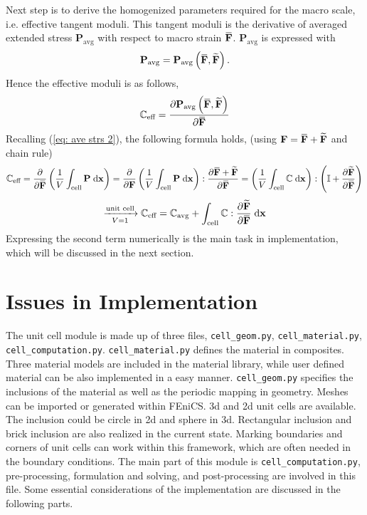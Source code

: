 \documentclass[10pt,a4paper]{scrreprt}
\newcommand{\myd}{\;\mathrm{d}}
\newcommand{\overbar}[1]{\mkern 1.5mu\overline{\mkern-1.5mu#1\mkern-1.5mu}\mkern 1.5mu}
\begin{document}
Next step is to derive the homogenized parameters required for the macro scale, i.e. effective tangent moduli. This tangent moduli is the derivative of averaged extended stress $\mathbf{P}_{\text{avg}}$ with respect to macro strain $\overbar{\mathbf{F}}$. $\mathbf{P}_{\text{avg}}$ is expressed with 
\begin{equation}
\mathbf{P}_{\text{avg}} = \mathbf{P}_{\text{avg}} \left( \overbar{\mathbf{F}}, \widetilde{\mathbf{F}} \right).
\end{equation}
Hence the effective moduli is as follows,
\begin{equation}
\mathbb{C}_{\text{eff}} = \dfrac{\partial \mathbf{P}_{\text{avg}} \left( \overbar{\mathbf{F}}, \widetilde{\mathbf{F}} \right)}{\partial \overbar{\mathbf{F}}}
\end{equation}
Recalling (\ref{eq: ave strs 2}), the following formula holds, (using $\mathbf{F} = \overbar{\mathbf{F}} + \widetilde{\mathbf{F}}$ and chain rule)
\[
\mathbb{C}_{\text{eff}} = \dfrac{\partial}{\partial \overbar{\mathbf{F}}} \left( \dfrac{1}{V} \int_{\text{cell}} \mathbf{P} \myd{\mathbf{x}} \right) = \dfrac{\partial}{\partial \mathbf{F}} \left( \dfrac{1}{V} \int_{\text{cell}} \mathbf{P} \myd{\mathbf{x}} \right) : \dfrac{\partial \overbar{\mathbf{F}} + \widetilde{\mathbf{F}}}{\partial \overbar{\mathbf{F}}} =  \left( \dfrac{1}{V} \int_{\text{cell}}  \mathbb{C} \myd{\mathbf{x}} \right) : \left( \mathbb{I} + \dfrac{\partial \widetilde{\mathbf{F}}}{\partial \overbar{\mathbf{F}}} \right)
\]
\begin{equation}
\label{eq: c eff}
\xrightarrow[ V = 1]{\text{unit cell}} \mathbb{C}_{\text{eff}} = \mathbb{C}_{\text{avg}} + \int_{\text{cell}}  \mathbb{C} : \dfrac{\partial \widetilde{\mathbf{F}}}{\partial \overbar{\mathbf{F}}} \myd{\mathbf{x}} 
\end{equation}
Expressing the second term numerically is the main task in implementation, which will be discussed in the next section.

\section{Issues in Implementation}
The unit cell module is made up of three files, \texttt{cell\_geom.py}, \texttt{cell\_material.py}, \texttt{cell\_computation.py}. \texttt{cell\_material.py} defines the material in composites. Three material models are included in the material library, while user defined material can be also implemented in a easy manner. \texttt{cell\_geom.py} specifies the inclusions of the material as well as the periodic mapping in geometry. Meshes can be imported or generated within FEniCS. 3d and 2d unit cells are available. The inclusion could be circle in 2d and sphere in 3d. Rectangular inclusion and brick inclusion are also realized in the current state. Marking boundaries and corners of unit cells can work within this framework, which are often needed in the boundary conditions. The main part of this module is \texttt{cell\_computation.py}, pre-processing, formulation and solving, and post-processing are involved in this file. Some essential considerations of the implementation are discussed in the following parts.
\end{document}
